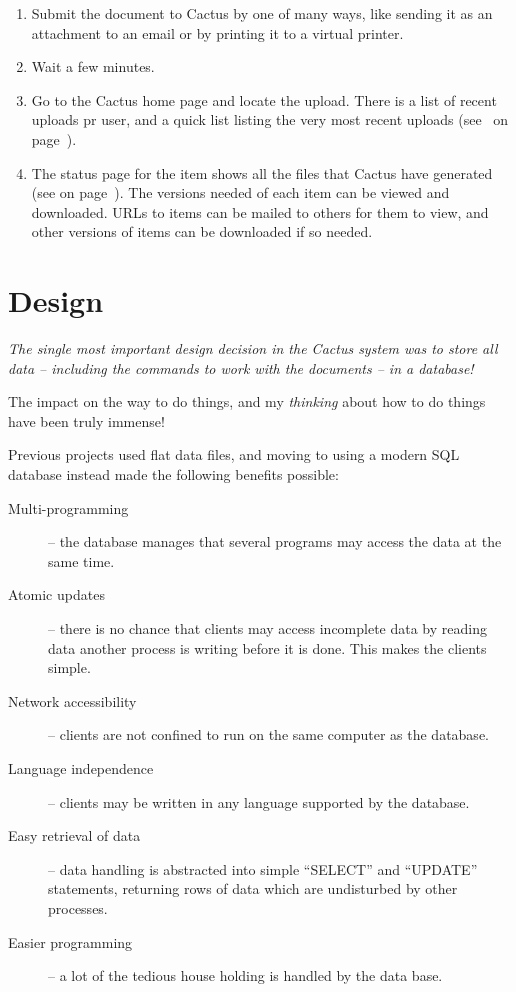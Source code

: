 \begin{enumerate}
\item Submit the document to Cactus by one of many ways, like sending
  it as an attachment to an email or by printing it to a virtual
  printer.

\item Wait a few minutes.

\item Go to the Cactus home page and locate the upload.  There is a
  list of recent uploads pr user, and a quick list listing the very
  most recent uploads (see~ on
  page~\pageref{fig:cactus-ten-most-recent}).

\item The status page for the item shows all the files that Cactus
  have generated (see  on
  page~\pageref{fig:cactus-splitted-email-from-lars}).  The versions
  needed of each item can be viewed and downloaded.  URLs to items can
  be mailed to others for them to view, and other versions of items
  can be downloaded if so needed.
\end{enumerate}

\section{Design}
\label{sec:cactus-design}

\textit{The single most important design decision in the Cactus system
was to store all data -- including the commands to work with the
documents -- in a database!}

The impact on the way to do things, and my \textit{thinking} about how
to do things have been truly immense!

Previous projects used flat data files, and moving to using a modern
SQL database instead made the following benefits
possible:

\begin{description}
\item[Multi-programming] -- the database manages that several programs
  may access the data at the same time.
\item[Atomic updates] --  there is no chance that clients may access
  incomplete data by reading data another process is writing before it
  is done.  This makes the clients simple.
\item[Network accessibility] -- clients are not confined to run on the
  same computer as the database.
\item[Language independence] -- clients may be written in any language
  supported by the database.
\item[Easy retrieval of data] -- data handling is abstracted into
   simple ``SELECT'' and ``UPDATE'' statements, returning rows of data
   which are undisturbed by other processes.

\item[Easier programming] -- a lot of the tedious house holding is
handled by the data base.

\end{description}

